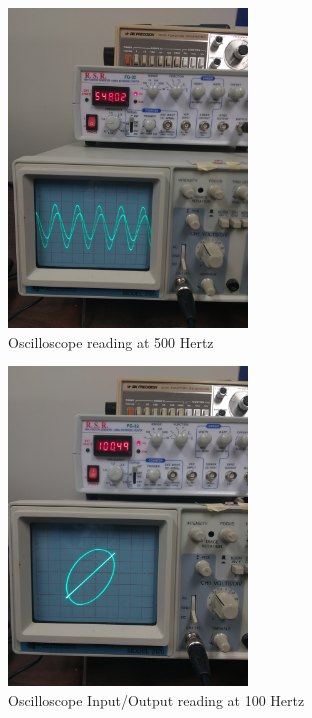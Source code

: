 \documentclass[12pt]{article}
\begin{document}
\begin{figure}[h!] %
   \centering
   \includegraphics[width=2.5in]{above_nat_freq.jpg} 
   \caption{Oscilloscope reading at 500 Hertz}
   \label{fig:example}
\end{figure}

\newpage

\begin{figure}[h!] %
   \centering
   \includegraphics[width=2.5in]{ab_below_nat_freq.jpg} 
   \caption{Oscilloscope Input/Output reading at 100 Hertz}
   \label{fig:example}
\end{figure}
\bigskip
\end{document}
